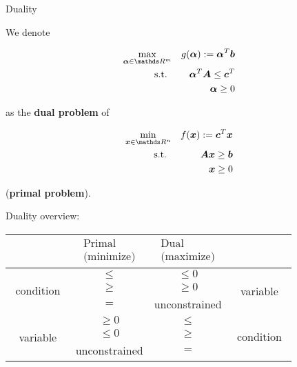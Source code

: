 \documentclass[11pt,compress,t,notes=noshow, xcolor=table]{beamer}
\begin{document}
\begin{vbframe}{Duality}

We denote

\vspace*{-0.2cm}
\begin{eqnarray*}
\max_{\bm{\alpha} \in \R^m} && g(\bm{\alpha}) := \bm{\alpha}^T\bm{b}\\
\text{s.t. } && \bm{\alpha}^T\bm{A} \le \bm{c}^T \\
&& \bm{\alpha} \ge 0
\end{eqnarray*}

as the \textbf{dual problem} of

\begin{eqnarray*}
\min_{\bm{x} \in \R^n} && f(\bm{x}) := \bm{c}^T\bm{x}\\
\text{s.t. } && \bm{A}\bm{x} \ge \bm{b} \\
&& \bm{x} \ge 0
\end{eqnarray*}

(\textbf{primal problem}).

\framebreak

Duality overview:

\begin{footnotesize}
\begin{center}
    \begin{tabular}{c | c | c | c}
    & $\begin{array}{c} \text{Primal} \\ \text{(minimize)} \end{array}$ & $\begin{array}{c} \text{Dual} \\ \text{(maximize)} \end{array}$ \\
    \hline
    \multirow{3}{*}{$\begin{array}{c} \text{condition} \end{array}$} & $\le$ & $\le 0$ & \multirow{3}{*}{variable} \\
  & $\ge$ & $\ge 0$ & \\
    & $=$ & unconstrained & \\
    \hline
    \multirow{3}{*}{variable} & $\ge 0 $ & $\le$ & \multirow{3}{*}{$\begin{array}{c} \text{condition} \end{array}$}\\
    & $\le 0$ &  $\ge$ & \\
    & unconstrained & $=$ & \\
\hline
    \end{tabular}
\end{center}
\end{footnotesize}
\end{vbframe}
\end{document}
